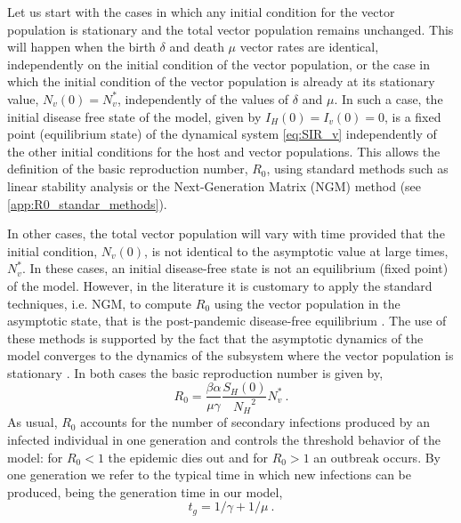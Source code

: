 Let us start with the cases in which any initial condition for the vector
population is stationary  and the total vector population remains unchanged.
This will happen when the birth $\delta$ and death $\mu$ vector rates are
identical, independently on the initial condition of the vector population, or
the case in which the initial condition of the vector population is already at
its stationary value, $N_v(0)=N_v^*$, independently of the values of $\delta$
and $\mu$. In such a case, the initial disease free state of the model, given
by $I_H(0)=I_v(0)=0$, is a fixed point (equilibrium state) of the dynamical
system \cref{eq:SIR_v} independently of the other initial conditions for the
host and vector populations. This allows the definition of the basic
reproduction number, $R_0$, using standard methods such as linear stability
analysis or the Next-Generation Matrix (NGM) method \cite{Diekmann2010} (see
\cref{app:R0_standar_methods}).

In other cases, the total vector population will vary with time provided
that the initial condition, $N_v(0)$, is not identical to the asymptotic value
at large times, $N_v^*$. In these cases, an initial disease-free state is not
an equilibrium (fixed point) of the model. However, in the literature it is
customary to apply the standard techniques, i.e. NGM, to compute $R_0$ using
the vector population in the asymptotic state, that is the post-pandemic
disease-free equilibrium \cite{Martcheva2008, Lashari2011, Shah2013, Zhao2020,
    Esteva1998}.
The use of these methods is supported by the fact that the asymptotic
dynamics of the model converges to the dynamics of the subsystem where the
vector population is stationary \cite{Thieme1992,Thieme1995}. In both cases
the basic reproduction number is given by,
\begin{equation}\label{eq:R0_asympt}
    R_0=\frac{\beta\alpha}{\mu\gamma}\frac{S_H(0)}{{N_H}^2}N_v^* \ .
\end{equation}
As usual, $R_0$ accounts for the number of secondary infections produced by
an infected individual in one generation and controls the threshold behavior of
the model: for $R_0<1$ the epidemic dies out and for $R_0>1$ an outbreak
occurs. By one generation we refer to the typical time in which new infections
can be produced, being the generation time in our model,
\begin{equation}
    t_g=1/\gamma + 1/\mu\ .
    \label{eq:generationtime}
\end{equation}

